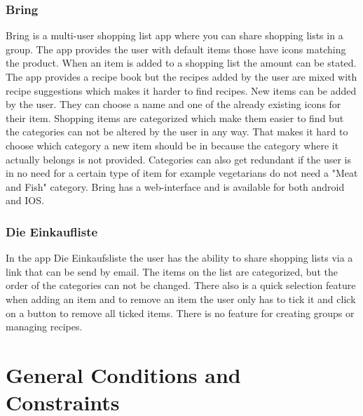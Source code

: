 \documentclass[12pt]{article}
\theoremstyle{definition}
\begin{document}
\subsubsection{Bring}
Bring is a multi-user shopping list app where you can share shopping lists in a group. The app provides the user with default items those have icons matching the product. When an item is added to a shopping list the amount can be stated. The app provides a recipe book but the recipes added by the user are mixed with recipe suggestions which makes it harder to find recipes. New items can be added by the user. They can choose a name and one of the already existing icons for their item. Shopping items are categorized which make them easier to find but the categories can not be altered by the user in any way. That makes it hard to choose which category a new item should be in because the category where it actually belongs is not provided. Categories can also get redundant if the user is in no need for a certain type of item for example vegetarians do not need a "Meat and Fish" category. Bring has a web-interface   and is available for both android and IOS.  
\subsubsection{Die Einkaufliste}
In the app Die Einkaufsliste the user has the ability to share shopping lists via a link that can be send by email. The items on the list are categorized, but the order of the categories can not be changed. There also is a quick selection feature when adding an item and to remove an item the user only has to tick it and click on a button to remove all ticked items. There  is no feature for creating groups or managing recipes.

\pagebreak

\section{General Conditions and Constraints}
\end{document}
